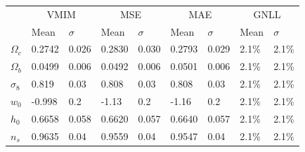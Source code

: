 \documentclass{aa}
\begin{document}
\begin{table}
  \begin{tabular}{|l|l|l|l|l|l|l|l|l|}
    \hline
    \multirow{2}{*}{} &
      \multicolumn{2}{c|}{VMIM} &
      \multicolumn{2}{c|}{MSE} &
      \multicolumn{2}{c|}{MAE} &
      \multicolumn{2}{c|}{GNLL} \\
    & Mean & $\sigma$ & Mean & $\sigma$ & Mean & $\sigma$  & Mean & $\sigma$ \\
    \hline
    $\Omega_c$ & 0.2742 & 0.026 & 0.2830 & 0.030 & 0.2793 & 0.029  & 2.1\% & 2.1\%\\
    \hline
    $\Omega_b$ & 0.0499 & 0.006 & 0.0492 & 0.006 &  0.0501 & 0.006 & 2.1\% & 2.1\% \\
    \hline
    $\sigma_8$ & 0.819 & 0.03 &0.808 & 0.03 &  0.808 &0.03 & 2.1\% & 2.1\% \\
    \hline
    $w_0$      &-0.998 & 0.2 &-1.13 & 0.2 & -1.16& 0.2  & 2.1\% & 2.1\% \\
    \hline
    $h_0$      & 0.6658 & 0.058 &0.6620 & 0.057 & 0.6640 & 0.057&  2.1\% & 2.1\% \\
    \hline
    $n_s$      & 0.9635 & 0.04 & 0.9559 & 0.04 & 0.9547 & 0.04  & 2.1\% & 2.1\% \\
    \hline
  \end{tabular}
\end{table}
\end{document}
